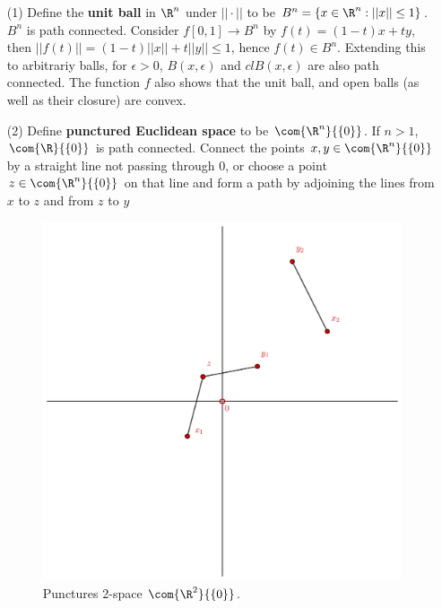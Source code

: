 \begin{example}
    \begin{enumerate}
        \item[(1)] Define the \textbf{unit ball} in $\R^n$ under  $||\cdot||$ to be  $B^n=\{x \in
            \R^n:||x|| \leq 1\}$. $B^n$ is path connected. Consider  $f[0,1] \rightarrow B^n$ by
            $f(t)=(1-t)x+ty$, then $||f(t)||=(1-t)||x||+t||y|| \leq 1$, hence $f(t) \in  B^n$.
            Extending this to arbitrariy balls, for $\epsilon>0$, $B(x,\epsilon)$ and
            $cl{B(x,\epsilon)}$ are also path connected. The function $f$ also shows that the unit
            ball, and open balls  (as well as their closure) are convex.

        \item[(2)] Define \textbf{punctured Euclidean space} to be $\com{\R^n}{\{0\}}$. If $n>1$,
        $\com{\R}{\{0\}}$ is path connected. Connect the points $x,y \in \com{\R^n}{\{0\}}$ by a
        straight line not passing through $0$, or choose a point $z \in \com{\R^n}{\{0\}}$ on that
        line and form a path by adjoining the lines from $x$ to  $z$ and from  $z$ to  $y$

        \begin{figure}[h]
            \centering
            \includegraphics[scale=0.2]{Figures/Chapter3/puncturedSpace.eps}
            \caption{Punctures $2$-space $\com{\R^2}{\{0\}}$.}
            \label{fig_3.1}
        \end{figure}


\end{enumerate}
\end{example}

